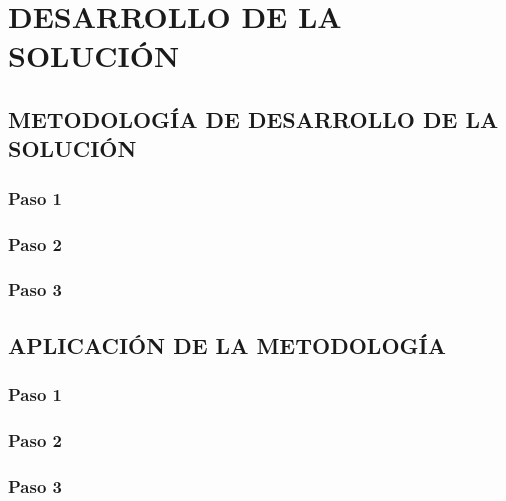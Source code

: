 \chapter{DESARROLLO DE LA SOLUCIÓN}


\section{METODOLOGÍA DE DESARROLLO DE LA SOLUCIÓN}

\lipsum[1]

\subsection{Paso 1}

\lipsum[2]

\subsection{Paso 2}

\lipsum[3]

\subsection{Paso 3}

\lipsum[4]


\section{APLICACIÓN DE LA METODOLOGÍA}

\lipsum[5]

\subsection{Paso 1}

\lipsum[6]

\subsection{Paso 2}

\lipsum[7]

\subsection{Paso 3}

\lipsum[8]